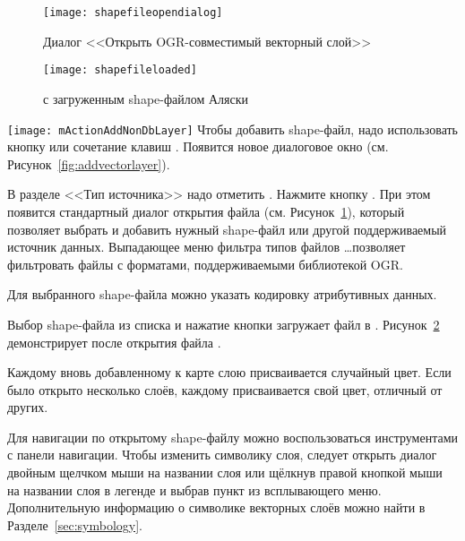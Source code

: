 \begin{figure}[ht]
   \centering
   \texttt{[image: shapefileopendialog]}
   \caption{Диалог <<Открыть OGR-совместимый векторный слой>> \wincaption}\label{fig:openshapefile}
\end{figure}

\begin{figure}[ht]
   \centering
   \texttt{[image: shapefileloaded]}
   \caption{\qg с загруженным shape-файлом Аляски \wincaption}\label{fig:loadedshapefile}
\end{figure}

\texttt{[image: mActionAddNonDbLayer]} Чтобы добавить shape-файл,
надо использовать кнопку 
 или сочетание клавиш .
Появится новое диалоговое окно (см. Рисунок~\ref{fig:addvectorlayer}).

В разделе <<Тип источника>> надо отметить . Нажмите
кнопку . При этом появится стандартный диалог открытия файла
(см. Рисунок~\ref{fig:openshapefile}), который позволяет выбрать и добавить
нужный shape-файл или другой поддерживаемый источник данных. Выпадающее меню
фильтра типов файлов \ldots позволяет фильтровать
файлы с форматами, поддерживаемыми библиотекой OGR.

Для выбранного shape-файла можно указать кодировку атрибутивных данных.

Выбор shape-файла из списка и нажатие кнопки  загружает
файл в \qg. Рисунок~\ref{fig:loadedshapefile} демонстрирует \qg после
открытия файла .

\begin{Tip}\caption{\textsc{Цвет слоя}}
Каждому вновь добавленному к карте слою присваивается случайный цвет.
Если было открыто несколько слоёв, каждому присваивается свой цвет,
отличный от других.
\end{Tip}

Для навигации по открытому shape-файлу можно воспользоваться инструментами
с панели навигации. Чтобы изменить символику слоя, следует открыть диалог
 двойным щелчком мыши на названии слоя или щёлкнув
правой кнопкой мыши на названии слоя в легенде и выбрав пункт
 из всплывающего меню. Дополнительную информацию
о символике векторных слоёв можно найти в Разделе~\ref{sec:symbology}.

